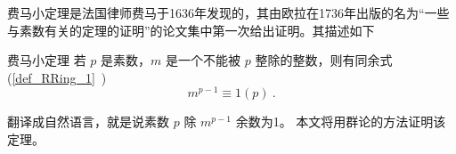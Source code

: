 费马小定理是法国律师费马于1636年发现的，其由欧拉在1736年出版的名为“一些与素数有关的定理的证明”的论文集中第一次给出证明。其描述如下
\begin{theorem}{费马小定理}
若 $p$ 是素数，$m$ 是一个不能被 $p$ 整除的整数，则有同余式(\autoref{def_RRing_1}~)
\begin{equation}
m^{p-1}\equiv 1(p)~.
\end{equation}
\end{theorem}
翻译成自然语言，就是说素数 $p$ 除 $m^{p-1}$ 余数为1。
本文将用群论的方法证明该定理。
